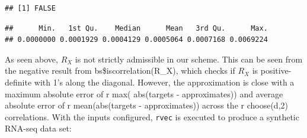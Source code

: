 \documentclass{article}
\newenvironment{Shaded}{\begin{snugshade}}{\end{snugshade}}
\newcommand{\AttributeTok}[1]{\textcolor[rgb]{0.77,0.63,0.00}{#1}}
\newcommand{\CommentTok}[1]{\textcolor[rgb]{0.56,0.35,0.01}{\textit{#1}}}
\newcommand{\ConstantTok}[1]{\textcolor[rgb]{0.00,0.00,0.00}{#1}}
\newcommand{\ControlFlowTok}[1]{\textcolor[rgb]{0.13,0.29,0.53}{\textbf{#1}}}
\newcommand{\DocumentationTok}[1]{\textcolor[rgb]{0.56,0.35,0.01}{\textbf{\textit{#1}}}}
\newcommand{\FunctionTok}[1]{\textcolor[rgb]{0.00,0.00,0.00}{#1}}
\newcommand{\NormalTok}[1]{#1}
\newcommand{\OtherTok}[1]{\textcolor[rgb]{0.56,0.35,0.01}{#1}}
\newcommand{\SpecialCharTok}[1]{\textcolor[rgb]{0.00,0.00,0.00}{#1}}
\begin{document}
\begin{Shaded}
\end{Shaded}

\begin{verbatim}
## [1] FALSE
\end{verbatim}

\begin{Shaded}
\end{Shaded}

\begin{verbatim}
##      Min.   1st Qu.    Median      Mean   3rd Qu.      Max. 
## 0.0000000 0.0001929 0.0004129 0.0005064 0.0007168 0.0069224
\end{verbatim}

As seen above, \(R_X\) is not strictly admissible in our scheme. This
can be seen from the negative result from bs\$iscorrelation(R\_X), which
checks if \(R_X\) is positive-definite with 1's along the diagonal.
However, the approximation is close with a maximum absolute error of r
max( abs(targets - approximates)) and average absolute error of r
mean(abs(targets - approximates)) across the r choose(d,2) correlations.
With the inputs configured, \texttt{rvec} is executed to produce a
synthetic RNA-seq data set:
\end{document}
